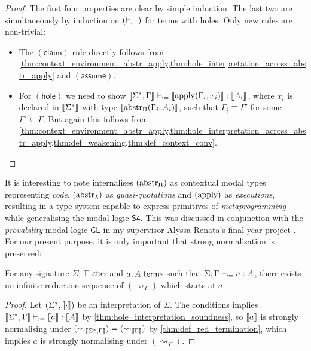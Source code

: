 \documentclass[twoside]{report}
\begin{document}
\begin{proof}
The first four properties are clear by simple induction. The last two are simultaneously by induction on $(\vdash_{:=})$ for terms with holes. Only new rules are non-trivial:
\begin{itemize}[noitemsep]
    \item The $(\mathsf{claim})$ rule directly follows from \cref{thm:context_environment_abstr_apply,thm:hole_interpretation_across_abstr_apply} and $(\mathsf{assume})$.
    \item For $(\mathsf{hole})$ we need to show $\llbracket{\Sigma^\ast, \Gamma}\rrbracket \vdash_{:=} \llbracket{\operatorname{apply}(\Gamma_i, x_i)}\rrbracket : \llbracket{A_i}\rrbracket$, where $x_i$ is declared in $\llbracket{\Sigma^\ast}\rrbracket$ with type $\llbracket{\operatorname{abstr}_\Pi(\Gamma_i, A_i)}\rrbracket$, such that $\Gamma_i \equiv \Gamma'$ for some $\Gamma' \subseteq \Gamma$. But again this follows from \cref{thm:context_environment_abstr_apply,thm:hole_interpretation_across_abstr_apply,thm:def_weakening,thm:def_context_conv}. \qedhere
\end{itemize}
\end{proof}

It is interesting to note \cite{nanevski2008contextual} internalises $(\operatorname{abstr}_\Pi)$ as contextual modal types representing \emph{code}, $(\operatorname{abstr}_\lambda)$ as \emph{quasi-quotations} and $(\operatorname{apply})$ as \emph{executions}, resulting in a type system capable to express primitives of \emph{metaprogramming} while generalising the modal logic $\mathsf{S4}$. This was discussed in conjunction with the \emph{provability} modal logic $\mathsf{GL}$ in my supervisor Alyssa Renata's final year project \cite{alyssa2019provability}. For our present purpose, it is only important that strong normalisation is preserved:

\begin{proposition}
\label{thm:hole_red_termination}
For any signature $\Sigma$, $\Gamma \ \mathsf{ctx}_{?}$ and $a,A \ \mathsf{term}_{?}$ such that $\Sigma; \Gamma \vdash_{:=} a : A$, there exists no infinite reduction sequence of $(\rightsquigarrow_\Gamma)$ which starts at $a$.
\end{proposition}

\begin{proof}
Let $(\Sigma^\ast, \llbracket{\cdot}\rrbracket)$ be an interpretation of $\Sigma$. The conditions implies $\llbracket{\Sigma^\ast, \Gamma}\rrbracket \vdash_{:=} \llbracket{a}\rrbracket : \llbracket{A}\rrbracket$ by \cref{thm:hole_interpretation_soundness}, so $\llbracket{a}\rrbracket$ is strongly normalising under $(\rightsquigarrow_{\llbracket{\Sigma^\ast, \Gamma}\rrbracket}) = (\rightsquigarrow_{\llbracket{\Gamma}\rrbracket})$ by \cref{thm:def_red_termination}, which implies $a$ is strongly normalising under $(\rightsquigarrow_\Gamma)$.
\end{proof}
\end{document}
